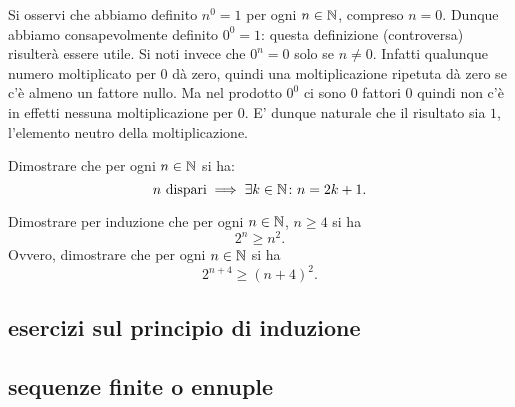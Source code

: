 Si osservi che abbiamo definito $n^0=1$ per ogni $n\in {\mathbb N}$,
compreso $n=0$. 
Dunque abbiamo consapevolmente definito $0^0=1$:
questa definizione (controversa) risulterà essere utile.
Si noti invece che $0^n=0$ solo se $n\neq 0$.
Infatti qualunque numero moltiplicato per $0$ dà zero, 
quindi una moltiplicazione ripetuta dà zero 
se c'è almeno un fattore nullo. 
Ma nel prodotto $0^0$ ci sono $0$ fattori $0$ quindi non c'è in effetti nessuna 
moltiplicazione per $0$. 
E' dunque naturale che il risultato sia $1$, 
l'elemento neutro della moltiplicazione.

\begin{exercise}
  Dimostrare che per ogni $n\in {\mathbb N}$ si ha:
  \[
    n \text{ dispari} \implies \exists k\in {\mathbb N}\colon n=2k+1.
  \]
\end{exercise}
  
\begin{exercise}
  Dimostrare per induzione che per ogni $n\in {\mathbb N}$, $n\ge 4$ si ha 
  \[  
    2^n \ge n^2.
  \]
  Ovvero, dimostrare che per ogni $n\in {\mathbb N}$ si ha 
  \[
    2^{n+4} \ge (n+4)^2.  
  \]
  \end{exercise}
  
\subsection{esercizi sul principio di induzione}

\subsection{sequenze finite o ennuple}
%
%

